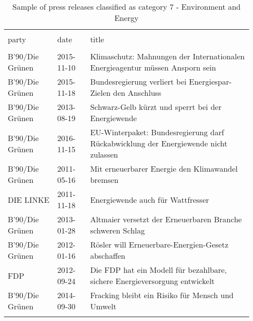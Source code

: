 
\begin{table}[!htbp] \centering 
  \caption{Sample of press releases classified as category 7 - Environment and Energy} 
  \label{tab:7-document-samples} 
\begin{tabularx}{\textwidth}{ssX} 
\\[-1.8ex]\hline 
\hline \\[-1.8ex] 
party & date & title \\ 
\hline \\[-1.8ex] 
B'90/Die Grünen & 2015-11-10 & Klimaschutz: Mahnungen der Internationalen Energieagentur müssen Ansporn sein \\ 
B'90/Die Grünen & 2015-11-18 & Bundesregierung verliert bei Energiespar-Zielen den Anschluss \\ 
B'90/Die Grünen & 2013-08-19 & Schwarz-Gelb kürzt und sperrt bei der Energiewende \\ 
B'90/Die Grünen & 2016-11-15 & EU-Winterpaket: Bundesregierung darf Rückabwicklung der Energiewende nicht zulassen \\ 
B'90/Die Grünen & 2011-05-16 & Mit erneuerbarer Energie den Klimawandel bremsen \\ 
DIE LINKE & 2011-11-18 & Energiewende auch für Wattfresser \\ 
B'90/Die Grünen & 2013-01-28 & Altmaier versetzt der Erneuerbaren Branche schweren Schlag \\ 
B'90/Die Grünen & 2012-01-16 & Rösler will Erneuerbare-Energien-Gesetz abschaffen \\ 
FDP & 2012-09-24 & Die FDP hat ein Modell für bezahlbare, sichere Energieversorgung entwickelt \\ 
B'90/Die Grünen & 2014-09-30 & Fracking bleibt ein Risiko für Mensch und Umwelt \\ 
\hline \\[-1.8ex] 
\end{tabularx} 
\end{table} 
